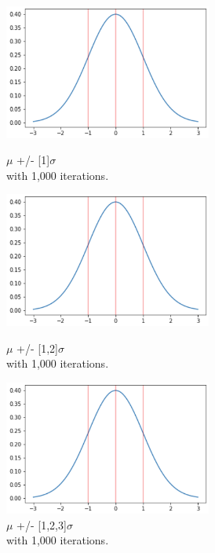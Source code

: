 \documentclass[12pt]{article}
\begin{document}
\begin{figure}[b]
\begin{subfigure}{.32\textwidth}
    \centering
    \includegraphics[width=0.75\textwidth]{sd_3.png}
    \caption[short]{$\mu$ +/- [1]$\sigma$ \\with 1,000 iterations.}
    \includegraphics[width=0.75\textwidth]{sd_3.png}
    \caption[short]{$\mu$ +/- [1,2]$\sigma$ \\with 1,000 iterations.}
    \includegraphics[width=0.75\textwidth]{sd_3.png}
    \caption[short]{$\mu$ +/- [1,2,3]$\sigma$ \\with 1,000 iterations.}
\end{subfigure}
\begin{subfigure}{.32\textwidth}

\end{subfigure}
\end{figure}
\end{document}
